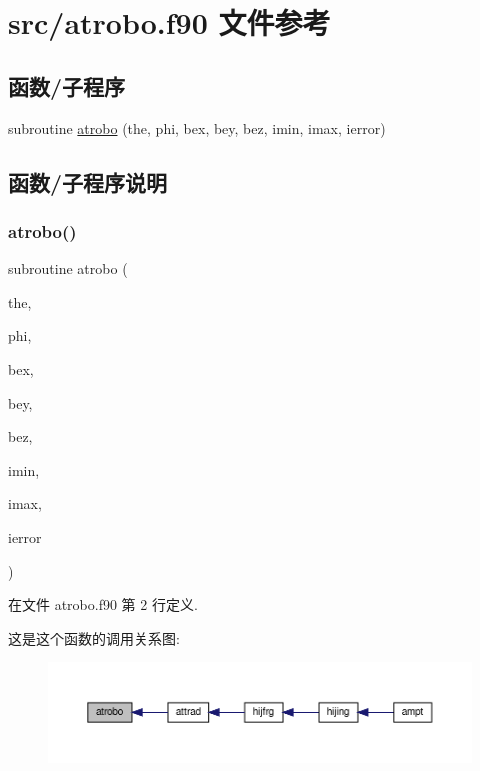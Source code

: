 \hypertarget{atrobo_8f90}{}\section{src/atrobo.f90 文件参考}
\label{atrobo_8f90}
\subsection*{函数/子程序}
\begin{DoxyCompactItemize}
\item 
subroutine \mbox{\hyperlink{atrobo_8f90_a250b8e76b901fb6ece238b0fda192c37}{atrobo}} (the, phi, bex, bey, bez, imin, imax, ierror)
\end{DoxyCompactItemize}


\subsection{函数/子程序说明}
\mbox{\label{atrobo_8f90_a250b8e76b901fb6ece238b0fda192c37}} 
\subsubsection{\texorpdfstring{atrobo()}{atrobo()}}
{\footnotesize\ttfamily subroutine atrobo (\begin{DoxyParamCaption}\item[{}]{the,  }\item[{}]{phi,  }\item[{}]{bex,  }\item[{}]{bey,  }\item[{}]{bez,  }\item[{}]{imin,  }\item[{}]{imax,  }\item[{}]{ierror }\end{DoxyParamCaption})}



在文件 atrobo.\+f90 第 2 行定义.

这是这个函数的调用关系图\+:
\nopagebreak
\begin{figure}[H]
\begin{center}
\leavevmode
\includegraphics[width=350pt]{atrobo_8f90_a250b8e76b901fb6ece238b0fda192c37_icgraph}
\end{center}
\end{figure}
